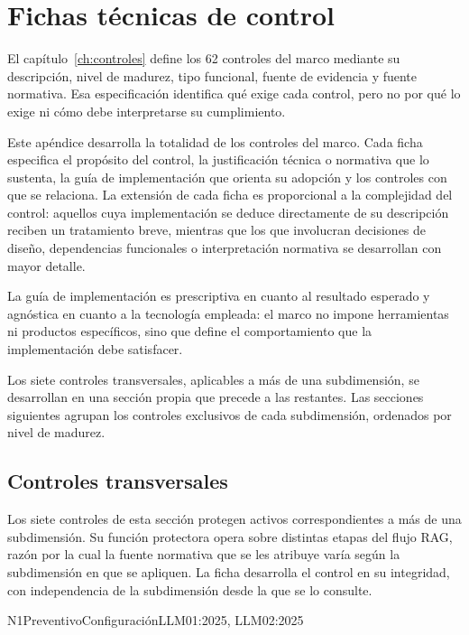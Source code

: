 \chapter{Fichas técnicas de control}
\label{app:fichas}

El capítulo~\ref{ch:controles} define los 62 controles del marco mediante su descripción, nivel de madurez, tipo funcional, fuente de evidencia y fuente normativa. Esa especificación identifica qué exige cada control, pero no por qué lo exige ni cómo debe interpretarse su cumplimiento.

Este apéndice desarrolla la totalidad de los controles del marco. Cada ficha especifica el propósito del control, la justificación técnica o normativa que lo sustenta, la guía de implementación que orienta su adopción y los controles con que se relaciona. La extensión de cada ficha es proporcional a la complejidad del control: aquellos cuya implementación se deduce directamente de su descripción reciben un tratamiento breve, mientras que los que involucran decisiones de diseño, dependencias funcionales o interpretación normativa se desarrollan con mayor detalle.

La guía de implementación es prescriptiva en cuanto al resultado esperado y agnóstica en cuanto a la tecnología empleada: el marco no impone herramientas ni productos específicos, sino que define el comportamiento que la implementación debe satisfacer.

Los siete controles transversales, aplicables a más de una subdimensión, se desarrollan en una sección propia que precede a las restantes. Las secciones siguientes agrupan los controles exclusivos de cada subdimensión, ordenados por nivel de madurez.

\section{Controles transversales}
\label{sec:fichas-transversales}

Los siete controles de esta sección protegen activos correspondientes a más de una subdimensión. Su función protectora opera sobre distintas etapas del flujo RAG, razón por la cual la fuente normativa que se les atribuye varía según la subdimensión en que se apliquen. La ficha desarrolla el control en su integridad, con independencia de la subdimensión desde la que se lo consulte.

  {N1}{Preventivo}{Configuración}{LLM01:2025, LLM02:2025}

